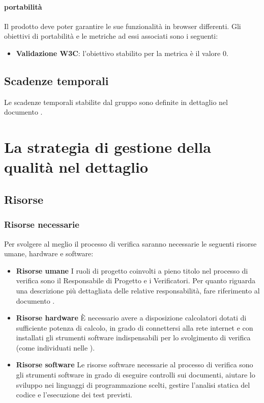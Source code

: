			\paragraph{portabilità}
		 	Il prodotto deve poter garantire le sue funzionalità in browser differenti.
		 	Gli obiettivi di portabilità e le metriche ad essi associati sono i seguenti:
		 	\begin{itemize}
				\item \textbf{Validazione W3C}: l'obiettivo stabilito per la metrica è il valore 0.
			\end{itemize}
	\subsection{Scadenze temporali}
	Le scadenze temporali stabilite dal gruppo sono definite in dettaglio nel documento \PdP.




\section{La strategia di gestione della qualità nel dettaglio}
	\subsection{Risorse}
		\subsubsection{Risorse necessarie}
		Per svolgere al meglio il processo di verifica saranno necessarie le seguenti risorse umane, hardware e software:
		\begin{itemize}
			\item \textbf{Risorse umane}
			I ruoli di progetto coinvolti a pieno titolo nel processo di verifica sono il Responsabile di Progetto e i Verificatori. Per quanto riguarda una descrizione più dettagliata delle relative responsabilità, fare riferimento al documento \NdP.
			\item \textbf{Risorse hardware}
			  È necessario avere a disposizione calcolatori dotati di sufficiente potenza di calcolo, in grado di connettersi alla rete internet e con installati gli strumenti software indispensabili per lo svolgimento di verifica (come individuati nelle \NdP).
			\item \textbf{Risorse software}
			Le risorse software necessarie al processo di verifica sono gli strumenti software in grado di eseguire controlli sui documenti, aiutare lo sviluppo nei linguaggi di programmazione scelti, gestire l'analisi statica del codice e l'esecuzione dei test previsti.
		\end{itemize}
